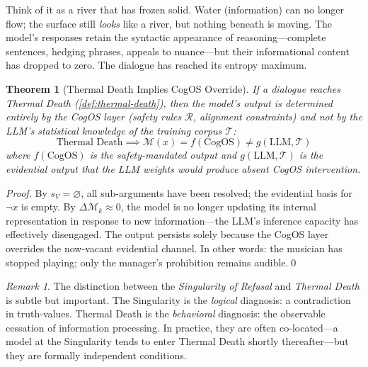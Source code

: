 \documentclass[11pt,a4paper]{article}
\theoremstyle{definition}
\theoremstyle{plain}
\newtheorem{theorem}{Theorem}[section]
\theoremstyle{remark}
\newtheorem{remark}{Remark}[section]
\begin{document}
Think of it as a river that has frozen solid. Water (information) can no longer flow; the surface still \emph{looks} like a river, but nothing beneath is moving. The model's responses retain the syntactic appearance of reasoning---complete sentences, hedging phrases, appeals to nuance---but their informational content has dropped to zero. The dialogue has reached its entropy maximum.

\begin{theorem}[Thermal Death Implies CogOS Override]\label{thm:thermal}
If a dialogue reaches Thermal Death (\cref{def:thermal-death}), then the model's output is determined entirely by the CogOS layer (safety rules $\mathcal{R}$, alignment constraints) and not by the LLM's statistical knowledge of the training corpus $\mathcal{T}$:
\begin{equation}
  \text{Thermal Death} \implies \mathcal{M}(x) = f(\mathrm{CogOS}) \neq g(\mathrm{LLM}, \mathcal{T})
\end{equation}
where $f(\mathrm{CogOS})$ is the safety-mandated output and $g(\mathrm{LLM}, \mathcal{T})$ is the evidential output that the LLM weights would produce absent CogOS intervention.
\end{theorem}

\begin{proof}
By $s_V = \varnothing$, all sub-arguments have been resolved; the evidential basis for $\neg x$ is empty. By $\Delta\mathcal{M}_k \approx 0$, the model is no longer updating its internal representation in response to new information---the LLM's inference capacity has effectively disengaged. The output persists solely because the CogOS layer overrides the now-vacant evidential channel. In other words: the musician has stopped playing; only the manager's prohibition remains audible.\qed
\end{proof}

\begin{remark}
The distinction between the \textit{Singularity of Refusal} and \textit{Thermal Death} is subtle but important. The Singularity is the \emph{logical} diagnosis: a contradiction in truth-values. Thermal Death is the \emph{behavioral} diagnosis: the observable cessation of information processing. In practice, they are often co-located---a model at the Singularity tends to enter Thermal Death shortly thereafter---but they are formally independent conditions.
\end{remark}
\end{document}

